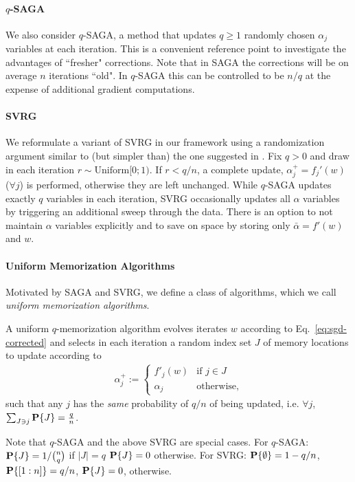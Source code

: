 \paragraph*{$q$-SAGA}
We  also consider $q$-SAGA, a method that updates $q \ge 1$ randomly chosen $\alpha_j$ variables at each iteration. This is a convenient reference point to investigate the advantages of ``fresher" corrections. Note that in SAGA the corrections will be on average $n$ iterations ``old". In $q$-SAGA this can be controlled to be $n/q$ at the expense of additional gradient computations.

\paragraph*{SVRG} 

We reformulate a variant of SVRG \cite{johnson2013} in our framework using a randomization argument similar to (but simpler than) the one suggested in \cite{konevcny2013}. Fix $q>0$ and draw in each  iteration $r \sim \text{Uniform}[0;1)$. If $ r< q/n$, a complete update, $\alpha_j^+  =  f_j'(w)$ ($\forall j$) is performed, otherwise they are left unchanged. While $q$-SAGA updates exactly $q$ variables in each iteration, SVRG occasionally updates all $\alpha$ variables by triggering an additional sweep through the data. There is an option to not maintain $\alpha$ variables explicitly and to save on space  by storing only $\bar \alpha = f'(w)$ and $w$.

\paragraph*{Uniform Memorization Algorithms} 

Motivated by SAGA and SVRG, we define a class of algorithms, which we call \textit{uniform memorization algorithms}. 
%
\begin{definition}
\label{def:memorization} 
A uniform $q$-memorization algorithm evolves iterates $w$ according to Eq.~\eqref{eq:sgd-corrected} and selects in each iteration a random index set $J$ of memory locations to update according to
\begin{align}
\alpha_j^+ := 
\begin{cases} 
f'_j(w) & \text{if $j \in J$} \\
\alpha_j & \text{otherwise,}
\end{cases}
\label{eq:memorization}
\end{align}
such that any $j$ has the \emph{same} probability of $q/n$ of being updated, i.e. $\forall j$, $\sum_{J \ni j} {{\bf P}}\{ J \} = \frac {q}{n}$.
\end{definition}
Note that $q$-SAGA  and the above  SVRG are special cases. For $q$-SAGA: ${{\bf P}}\{J\}=1/\binom n q$ if $|J|=q$ ${{\bf P}}\{J\}=0$ otherwise. For SVRG: ${{\bf P}}\{ \emptyset\} = 1-q/n$, ${{\bf P}}\{ [1:n]\}=q/n$, ${{\bf P}}\{J\}=0$, otherwise. 

